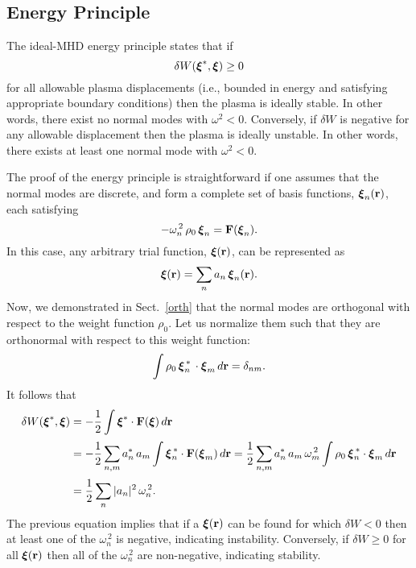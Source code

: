\documentclass[12pt,prb,aps,notitlepage]{revtex4-1}
\newcommand{\bxi}{\mbox{\boldmath$\xi$}}
\begin{document}
\subsection{Energy Principle}
The ideal-MHD energy principle states that if
\begin{equation}
\delta W(\bxi^\ast,\bxi) \geq 0
\end{equation}
for all allowable plasma displacements (i.e., bounded in energy and satisfying appropriate boundary conditions) then
the plasma is ideally stable. In other words, there exist no normal modes with $\omega^2<0$. Conversely, if $\delta W$ is negative
for any allowable displacement then the plasma is ideally unstable. In other words, there exists at least one normal mode with $\omega^2<0$. 

The proof of the energy principle is straightforward if one assumes that the normal modes are discrete, and form a complete set of
basis functions, $\bxi_n({\bf r})$, each satisfying
\begin{equation}
-\omega_n^{\,2}\,\rho_0\,\bxi_n = {\bf F}({\bxi}_n).
\end{equation}
In this case, any arbitrary trial function, $\bxi({\bf r})$, can be represented as
\begin{equation}
\bxi({\bf r}) = \sum_n a_n\,\bxi_n({\bf r}).
\end{equation}
Now, we demonstrated in Sect.~\ref{orth} that the normal modes are orthogonal with respect to the weight function $\rho_0$. Let us
normalize them such that they are orthonormal with respect to this weight function:
\begin{equation}
\int \rho_0\,\bxi_n^{\,\ast}\,\cdot\bxi_m\,d{\bf r} = \delta_{nm}.
\end{equation}
It follows that
\begin{align}
\delta W(\bxi^\ast,\bxi) &= -\frac{1}{2}\int\bxi^\ast\cdot {\bf F}(\bxi)\,d{\bf r}\nonumber\\[0.5ex]
&= -\frac{1}{2}\sum_{n,m}a_n^{\ast}\,a_m\int \bxi_n^{\,\ast}\cdot {\bf F}(\bxi_m)\,d{\bf r}=\frac{1}{2}\sum_{n,m}a_n^{\ast}\,a_m\,\omega_m^{\,2}\int \rho_0\,\bxi_n^{\,\ast}\cdot \bxi_m\,d{\bf r}\nonumber\\[0.5ex]
&= \frac{1}{2}\sum_n|a_n|^2\,\omega_n^{\,2}.
\end{align}
The previous equation implies that if a $\bxi({\bf r})$ can be found for which $\delta W <0$ then at least
one of the $\omega_n^{\,2}$ is negative, indicating instability. Conversely, if $\delta W\geq 0$ for all
$\bxi({\bf r})$ then all of the $\omega_n^{\,2}$ are non-negative, indicating stability. 
\end{document}
